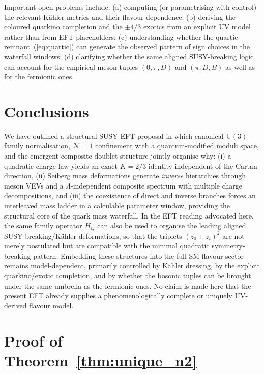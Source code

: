 \documentclass[11pt,a4paper]{article}
\newcommand{\UU}{\mathrm{U}}
\begin{document}
Important open problems include:
(a) computing (or parametrising with control) the relevant K\"ahler metrics and
their flavour dependence;
(b) deriving the coloured quarkino completion and the $\pm4/3$ exotics from an
explicit UV model rather than from EFT placeholders;
(c) understanding whether the quartic remnant~(\ref{eq:quartic}) can generate the
observed pattern of sign choices in the waterfall windows;
(d) clarifying whether the same aligned SUSY-breaking logic can account for the
empirical meson tuples $(0,\pi,D)$ and $(\pi,D,B)$ as well as for the fermionic
ones.

\section{Conclusions}
\label{sec:concl}

We have outlined a structural SUSY EFT proposal in which canonical $\UU(3)$
family normalisation, $\mathcal{N}{=}1$ confinement with a quantum-modified
moduli space, and the emergent composite doublet structure
jointly organise why:
(i) a quadratic charge law yields an exact $K=2/3$ identity independent of
the Cartan direction,
(ii) Seiberg mass deformations generate \emph{inverse} hierarchies through
meson VEVs and a $\Lambda$-independent composite spectrum with multiple
charge decompositions, and
(iii) the coexistence of direct and inverse branches forces an interleaved
mass ladder in a calculable parameter window, providing the structural core
of the quark mass waterfall.
In the EFT reading advocated here, the same family operator $H_Q$ can also be
used to organise the leading aligned SUSY-breaking/K\"ahler deformations, so
that the triplets $(z_0+z_i)^2$ are not merely postulated but are compatible
with the minimal quadratic symmetry-breaking pattern.  Embedding these structures into
the full SM flavour sector remains model-dependent, primarily controlled by
K\"ahler dressing, by the explicit quarkino/exotic completion, and by whether
the bosonic tuples can be brought under the same umbrella as the fermionic
ones.  No claim is made here that the present EFT already supplies a
phenomenologically complete or uniquely UV-derived flavour model.

\appendix

\section{Proof of Theorem~\ref{thm:unique_n2}}
\label{app:unique}
\end{document}
